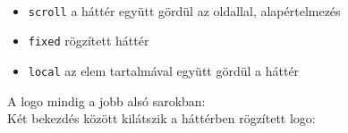 \begin{frame}
  \begin{exampleblock}{}
    \fontsize{7}{8} \selectfont
    
    
    
    
    
  \end{exampleblock}
\end{frame}

\begin{frame}
  \begin{description}[m]
    \item[\texttt{background-attachment}] \hfill \\
      \begin{itemize}
        \item \texttt{scroll} a háttér együtt gördül az oldallal, 
        alapértelmezés
        \item \texttt{fixed} rögzített háttér
        \item \texttt{local} az elem tartalmával együtt gördül a háttér
      \end{itemize}
      \vfill
      A logo mindig a jobb alsó sarokban: 
      \\
      Két bekezdés között kilátszik a háttérben rögzített logo: 
  \end{description}
\end{frame}

